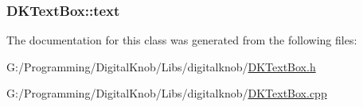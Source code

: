 \hypertarget{class_d_k_text_box_a92959dde5c47d879ba3efce54c301386}{
\subsubsection[{text}]{ D\-K\-Text\-Box\-::text}}\label{class_d_k_text_box_a92959dde5c47d879ba3efce54c301386}


The documentation for this class was generated from the following files\-:\begin{DoxyCompactItemize}
\item 
G\-:/\-Programming/\-Digital\-Knob/\-Libs/digitalknob/\hyperlink{_d_k_text_box_8h}{D\-K\-Text\-Box.\-h}\item 
G\-:/\-Programming/\-Digital\-Knob/\-Libs/digitalknob/\hyperlink{_d_k_text_box_8cpp}{D\-K\-Text\-Box.\-cpp}\end{DoxyCompactItemize}
